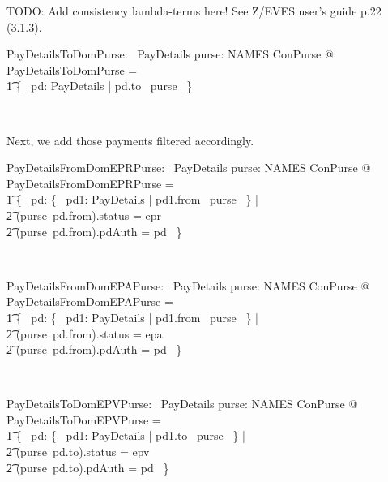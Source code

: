 TODO: Add consistency lambda-terms here! See Z/EVES user's guide p.22 (3.1.3).
\begin{LNewADef}
\begin{axdef}
   PayDetailsToDomPurse: \power~PayDetails
\where
    \forall purse: NAMES \finj ConPurse @ PayDetailsToDomPurse = \\
    \t1 \{~ pd: PayDetails | pd.to \in \dom~purse ~\}
\end{axdef}~\end{LNewADef}
%
Next, we add those payments filtered accordingly.
%
\begin{LNewADef}
\begin{axdef}
   PayDetailsFromDomEPRPurse: \power~PayDetails
\where
    \forall purse: NAMES \finj ConPurse @ PayDetailsFromDomEPRPurse = \\
    \t1 \{~ pd: \{~ pd1: PayDetails | pd1.from \in \dom~purse ~\} | \\
        \t2 (purse~pd.from).status = epr \\
        \t2 \land (purse~pd.from).pdAuth = pd ~\}
\end{axdef}~\end{LNewADef}
%
\begin{LNewADef}
\begin{axdef}
   PayDetailsFromDomEPAPurse: \power~PayDetails
\where
    \forall purse: NAMES \finj ConPurse @ PayDetailsFromDomEPAPurse = \\
    \t1 \{~ pd: \{~ pd1: PayDetails | pd1.from \in \dom~purse ~\} | \\
        \t2 (purse~pd.from).status = epa \\
        \t2 \land (purse~pd.from).pdAuth = pd ~\}
\end{axdef}~\end{LNewADef}
%
\begin{LNewADef}
\begin{axdef}
   PayDetailsToDomEPVPurse: \power~PayDetails
\where
    \forall purse: NAMES \finj ConPurse @ PayDetailsToDomEPVPurse = \\
    \t1 \{~ pd: \{~ pd1: PayDetails | pd1.to \in \dom~purse ~\} | \\
        \t2 (purse~pd.to).status = epv \land \\
        \t2 (purse~pd.to).pdAuth = pd ~\}
\end{axdef}~\end{LNewADef}
